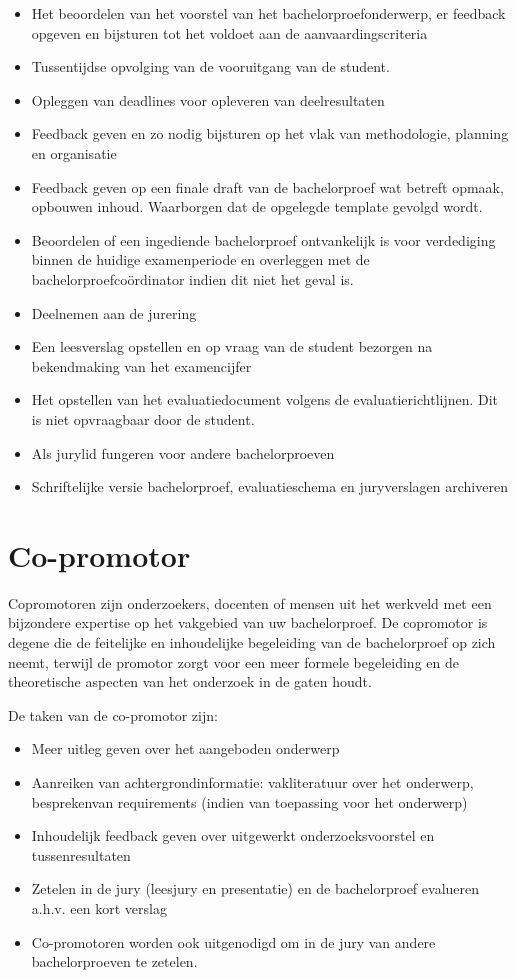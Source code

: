 \begin{itemize}
	\item Het beoordelen van het voorstel van het bachelorproefonderwerp, er feedback opgeven en bijsturen tot het voldoet aan de aanvaardingscriteria
	\item Tussentijdse opvolging van de vooruitgang van de student.
	\item Opleggen  van  deadlines  voor  opleveren  van  deelresultaten
	\item Feedback geven en zo nodig bijsturen op het vlak van methodologie, planning en organisatie
	\item Feedback geven op een finale draft van de bachelorproef wat betreft opmaak, opbouwen inhoud. Waarborgen dat de opgelegde template gevolgd wordt.
	\item Beoordelen of een ingediende bachelorproef ontvankelijk is voor verdediging binnen de huidige examenperiode en overleggen met de bachelorproefcoördinator indien dit niet het geval is.
	\item Deelnemen aan de jurering
	\item Een leesverslag opstellen en op vraag van de student bezorgen na bekendmaking van het examencijfer
	\item Het opstellen van het evaluatiedocument volgens de evaluatierichtlijnen. Dit is niet opvraagbaar door de student.
	\item Als jurylid fungeren voor andere bachelorproeven
	\item Schriftelijke versie bachelorproef, evaluatieschema en juryverslagen archiveren	
\end{itemize}

\section{Co-promotor}
\label{sec:copromotor}
Copromotoren zijn onderzoekers, docenten of mensen uit het werkveld met een bijzondere expertise op het vakgebied van uw bachelorproef. De copromotor is degene die de feitelijke en inhoudelijke begeleiding van de bachelorproef op zich neemt, terwijl de promotor zorgt voor een meer formele begeleiding en de theoretische aspecten van het onderzoek in de gaten houdt. 

De taken van de co-promotor zijn: 

\begin{itemize}
	\item Meer uitleg geven over het aangeboden onderwerp
	\item Aanreiken van achtergrondinformatie: vakliteratuur over het onderwerp, besprekenvan requirements (indien van toepassing voor het onderwerp)
	\item Inhoudelijk feedback geven over uitgewerkt onderzoeksvoorstel en tussenresultaten
	\item Zetelen in de jury (leesjury en presentatie) en de bachelorproef evalueren a.h.v. een kort verslag 
	\item Co-promotoren worden ook uitgenodigd om in de jury van andere bachelorproeven te zetelen.
\end{itemize}

